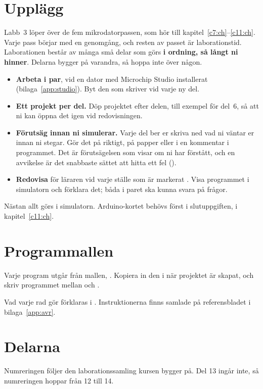 \section{Upplägg}
\label{lab3:sec:setup}
Labb~3 löper över de fem mikrodatorpassen, som hör till kapitel~\ref{c7:ch}--\ref{c11:ch}. Varje
pass börjar med en genomgång, och resten av passet är laborationstid. Laborationen består av många
små delar som görs \textbf{i ordning, så långt ni hinner}. Delarna bygger på varandra, så hoppa
inte över någon.
\begin{itemize}
  \item \textbf{Arbeta i par}, vid en dator med Microchip Studio installerat
    (bilaga~\ref{app:studio}). Byt den som skriver vid varje ny del.
  \item \textbf{Ett projekt per del.} Döp projektet efter delen, till exempel  för
    del~6, så att ni kan öppna det igen vid redovisningen.
  \item \textbf{Förutsäg innan ni simulerar.} Varje del ber er skriva ned vad ni väntar er innan ni
    stegar. Gör det på riktigt, på papper eller i en kommentar i programmet. Det är förutsägelsen
    som visar om ni har förstått, och en avvikelse är det snabbaste sättet att hitta ett fel
    ().
  \item \textbf{Redovisa} för läraren vid varje ställe som är markerat
    . Visa programmet i simulatorn och förklara det; båda i paret ska
    kunna svara på frågor.
\end{itemize}

Nästan allt görs i simulatorn. Arduino-kortet behövs först i slutuppgiften, i
kapitel~\ref{c11:ch}.

\section{Programmallen}
\label{lab3:template}
Varje program utgår från mallen, . Kopiera in den i
 när projektet är skapat, och skriv programmet mellan  och .


Vad varje rad gör förklaras i . Instruktionerna finns samlade på referensbladet i
bilaga~\ref{app:avr}.

\section{Delarna}
\label{lab3:sec:parts}
Numreringen följer den laborationssamling kursen bygger på. Del 13 ingår inte, så numreringen
hoppar från 12 till 14.

